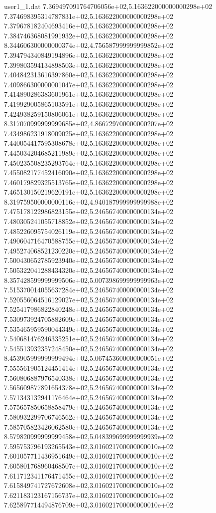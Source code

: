 \begin{filecontents}{user1_1.dat}
7.369497091764706056e+02,5.163622000000000298e+02
7.374698395314787831e+02,5.163622000000000298e+02
7.379678182404693416e+02,5.163622000000000298e+02
7.384746368081991932e+02,5.163622000000000298e+02
8.344606300000000374e+02,4.756587999999999852e+02
7.394794340849194896e+02,5.163622000000000298e+02
7.399803594134898503e+02,5.163622000000000298e+02
7.404842313616397860e+02,5.163622000000000298e+02
7.409866300000001047e+02,5.163622000000000298e+02
7.414890286383601961e+02,5.163622000000000298e+02
7.419929005865103591e+02,5.163622000000000298e+02
7.424938259150806061e+02,5.163622000000000298e+02
8.317070999999999685e+02,4.866729700000000207e+02
7.434986231918009025e+02,5.163622000000000298e+02
7.440054417595308678e+02,5.163622000000000298e+02
7.445034204685211989e+02,5.163622000000000298e+02
7.450235508235293764e+02,5.163622000000000298e+02
7.455082177452416090e+02,5.163622000000000298e+02
7.460179829325513765e+02,5.163622000000000298e+02
7.465130150219620191e+02,5.163622000000000298e+02
8.319759500000000116e+02,4.940187999999999988e+02
7.475178122986823155e+02,5.246567400000000134e+02
7.480305241055718852e+02,5.246567400000000134e+02
7.485226095754026119e+02,5.246567400000000134e+02
7.490604716470588755e+02,5.246567400000000134e+02
7.495274068521230220e+02,5.246567400000000134e+02
7.500430652785923940e+02,5.246567400000000134e+02
7.505322041288434320e+02,5.246567400000000134e+02
8.357428599999999506e+02,5.007398699999999963e+02
7.515370014055637284e+02,5.246567400000000134e+02
7.520556064516129027e+02,5.246567400000000134e+02
7.525417986822840248e+02,5.246567400000000134e+02
7.530973924705882609e+02,5.246567400000000134e+02
7.535465959590044349e+02,5.246567400000000134e+02
7.540681476246335251e+02,5.246567400000000134e+02
7.545513932357248450e+02,5.246567400000000134e+02
8.453905999999999494e+02,5.067453600000000051e+02
7.555561905124451414e+02,5.246567400000000134e+02
7.560806887976540338e+02,5.246567400000000134e+02
7.565609877891654378e+02,5.246567400000000134e+02
7.571343132941176464e+02,5.246567400000000134e+02
7.575657850658858479e+02,5.246567400000000134e+02
7.580932299706746562e+02,5.246567400000000134e+02
7.585705823426062580e+02,5.246567400000000134e+02
8.579820999999999458e+02,5.048399699999999939e+02
7.595753796193265543e+02,3.016021700000000010e+02
7.601057711436951649e+02,3.016021700000000010e+02
7.605801768960468507e+02,3.016021700000000010e+02
7.611712341176471455e+02,3.016021700000000010e+02
7.615849741727672608e+02,3.016021700000000010e+02
7.621183123167156737e+02,3.016021700000000010e+02
7.625897714494876709e+02,3.016021700000000010e+02

\end{filecontents}
